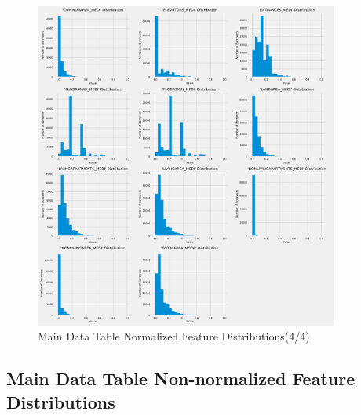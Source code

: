 \documentclass[12pt, letterpaper]{article}
\begin{document}
\begin{appendices}
\pagebreak

\begin{figure}[ht]
\includegraphics[width=0.89\textwidth]{main-data-table-normal-feature-distribs-p4}
\centering
\caption{Main Data Table Normalized Feature Distributions(4/4)}
\end{figure}

\pagebreak

\subsection{Main Data Table Non-normalized Feature Distributions}
\label{nonnormalfeaturedistribs}


\end{appendices}
\end{document}
